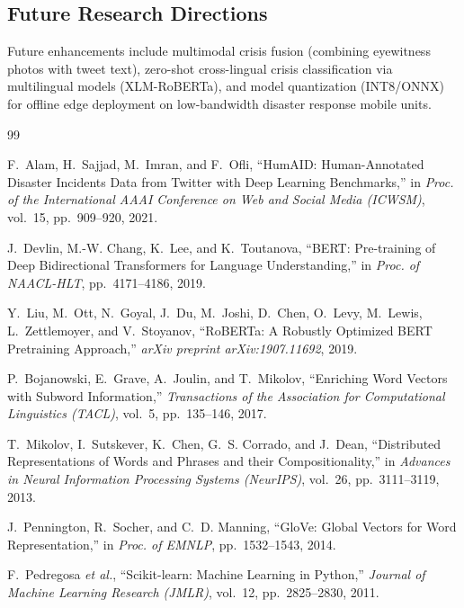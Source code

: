 \documentclass[12pt,a4paper]{article}
\begin{document}
\subsection{Future Research Directions}
Future enhancements include multimodal crisis fusion (combining eyewitness photos with tweet text), zero-shot cross-lingual crisis classification via multilingual models (XLM-RoBERTa), and model quantization (INT8/ONNX) for offline edge deployment on low-bandwidth disaster response mobile units.

\begin{thebibliography}{99}

F.~Alam, H.~Sajjad, M.~Imran, and F.~Ofli, ``HumAID: Human-Annotated Disaster Incidents Data from Twitter with Deep Learning Benchmarks,'' in \emph{Proc. of the International AAAI Conference on Web and Social Media (ICWSM)}, vol.~15, pp.~909--920, 2021.

J.~Devlin, M.-W. Chang, K.~Lee, and K.~Toutanova, ``BERT: Pre-training of Deep Bidirectional Transformers for Language Understanding,'' in \emph{Proc. of NAACL-HLT}, pp.~4171--4186, 2019.

Y.~Liu, M.~Ott, N.~Goyal, J.~Du, M.~Joshi, D.~Chen, O.~Levy, M.~Lewis, L.~Zettlemoyer, and V.~Stoyanov, ``RoBERTa: A Robustly Optimized BERT Pretraining Approach,'' \emph{arXiv preprint arXiv:1907.11692}, 2019.

P.~Bojanowski, E.~Grave, A.~Joulin, and T.~Mikolov, ``Enriching Word Vectors with Subword Information,'' \emph{Transactions of the Association for Computational Linguistics (TACL)}, vol.~5, pp.~135--146, 2017.

T.~Mikolov, I.~Sutskever, K.~Chen, G.~S. Corrado, and J.~Dean, ``Distributed Representations of Words and Phrases and their Compositionality,'' in \emph{Advances in Neural Information Processing Systems (NeurIPS)}, vol.~26, pp.~3111--3119, 2013.

J.~Pennington, R.~Socher, and C.~D. Manning, ``GloVe: Global Vectors for Word Representation,'' in \emph{Proc. of EMNLP}, pp.~1532--1543, 2014.

F.~Pedregosa \emph{et al.}, ``Scikit-learn: Machine Learning in Python,'' \emph{Journal of Machine Learning Research (JMLR)}, vol.~12, pp.~2825--2830, 2011.

\end{thebibliography}
\end{document}
